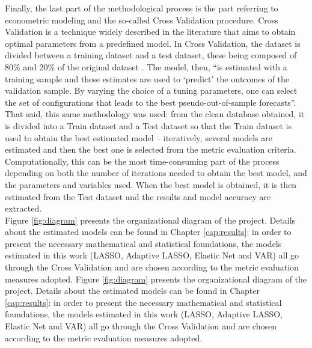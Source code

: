 Finally, the last part of the methodological process is the part referring to econometric modeling and the so-called Cross Validation procedure. Cross Validation is a technique widely described in the literature \cite[]{hoornweg2018science, hastie2009elements, stone1974cross, breiman1992submodel} that aims to obtain optimal parameters from a predefined model. In Cross Validation, the dataset is divided between a training dataset and a test dataset, these being composed of 80\% and 20\% of the original dataset \cite[291]{breiman1992submodel}. The model, then, ``is estimated with a training sample and these estimates are used to ‘predict’ the outcomes of the validation sample. By varying the choice of a tuning parameters, one can select the set of configurations that leads to the best pseudo-out-of-sample forecasts''\cite[p.136]{hoornweg2018science}.\\

That said, this same methodology was used: from the clean database obtained, it is divided into a Train dataset and a Test dataset so that the Train dataset is used to obtain the best estimated model -- iteratively, several models are estimated and then the best one is selected from the metric evaluation criteria. Computationally, this can be the most time-consuming part of the process depending on both the number of iterations needed to obtain the best model, and the parameters and variables used. When the best model is obtained, it is then estimated from the Test dataset and the results and model accuracy are extracted.\\

Figure \ref{fig:diagram} presents the organizational diagram of the project. Details about the estimated models can be found in Chapter \ref{cap:results}: in order to present the necessary mathematical and statistical foundations, the models estimated in this work (LASSO, Adaptive LASSO, Elastic Net and VAR) all go through the Cross Validation and are chosen according to the metric evaluation measures adopted. Figure \ref{fig:diagram} presents the organizational diagram of the project. Details about the estimated models can be found in Chapter \ref{cap:results}: in order to present the necessary mathematical and statistical foundations, the models estimated in this work (LASSO, Adaptive LASSO, Elastic Net and VAR) all go through the Cross Validation and are chosen according to the metric evaluation measures adopted. \\



